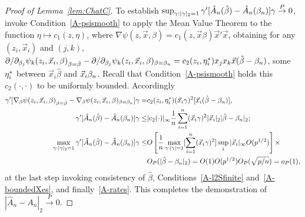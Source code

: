 \documentclass{article}
\theoremstyle{remark}
\begin{document}
\begin{proof}[Proof of Lemma~\ref{lem:ChatC}]
To establish $\sup_{\gamma: |\gamma|_{2}=1}\gamma'[\hat{A}_{n}(\hat\beta) - \hat{A}_{n}(\beta_{n }) ]\gamma  \stackrel{P}{\rightarrow} 0$,  invoke Condition~\ref{A-psismooth} to apply the Mean Value Theorem to the function $\eta \mapsto c_{1}(z, \eta)$, where $\nabla \psi(z, \vec{x}, \beta)  = c_{1}(z, \vec{x}\beta) \vec{x}'\vec{x}$, obtaining for any $(z_{i}, \vec{x}_{i})$ and $(j,k)$, $\partial/\partial_{\beta_{j}}\psi_{k}(z_{i}, \vec{x}_{i},\beta)_{\beta = \hat\beta} - \partial/\partial_{\beta_{j}}\psi_{k}(z_{i}, \vec{x}_{i}, \beta)_{\beta = \beta_{n }}  =  c_{2}(z_{i}, \eta^*_{i})x_{j}x_{k}\vec{x}(\hat\beta - \beta_{n })$, some $\eta^*_{i}$ between $\vec{x}_{i}\hat\beta$ and $\vec{x}_{i}\beta_{n }$. Recall that Condition~\ref{A-psismooth} holds this $c_{2}(\cdot, \cdot)$ to be uniformly bounded. Accordingly
\begin{align}
  \gamma'[\nabla_{\beta} \psi(z_{i}, \vec{x}_{i},\beta)_{\beta = \hat\beta} - \nabla_{\beta} \psi (z_{i}, \vec{x}_{i},\beta)_{\beta = \beta_{n }}]\gamma =& c_{2}(z_{i}, \eta^*_{i}) (\vec{x}_{i}\gamma)^{2} [\vec{x}_{i}(\hat\beta - \beta_{n })], \nonumber \\
\gamma'[\hat{A}_{n}(\hat\beta) - \hat{A}_{n}(\beta_{n }) ]\gamma \leq & 
|c_{2}(\cdot)|_{\infty}\frac{1}{n} \sum_{i=1}^{n}(\vec{x}_{i}\gamma)^{2}
|\vec{x}_{i}|_{2} |\hat\beta - \beta_{n }|_{2}
\label{eq:21};\\
\max_{\gamma: |\gamma|_{2}=1} \gamma'[\hat{A}_{n}(\hat\beta) - \hat{A}_{n}(\beta_{n }) ]\gamma \leq & O \left[\frac{1}{n} 
\max_{\gamma :|\gamma|=1} [\sum_{i=1}^{n}(\vec{x}_{i}\gamma)^{2}] \sup_{i}|\vec{x}_{i}|_{\infty} O(p^{1/2})
\right] \times  \nonumber \\
& O_{P}(|\hat\beta - \beta_{n } |_{2})   = O(1)O(p^{1/2}) O_{P}(\sqrt{p/n}) = o_{P}(1), \nonumber
\end{align}
at the last step invoking consistency of $\hat\beta$,
Conditions~\ref{A-l2Sfinite} and~\ref{A-boundedXes}, and finally~\ref{A-rates}. 
This completes the demonstration of $|\hat{A}_{n} - A_{n}|_{2} \stackrel{P}{\rightarrow} 0$.


\end{proof}
\end{document}
